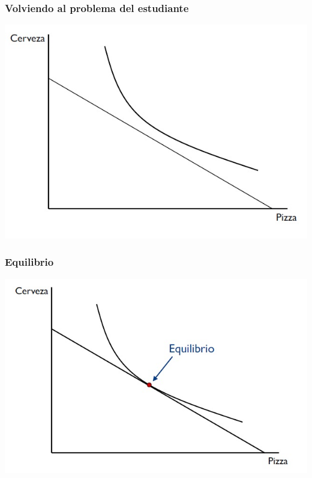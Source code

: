 \documentclass{beamer}
\begin{document}
\begin{frame}
\frametitle{ Volviendo al problema del estudiante}
\centering
\includegraphics[scale=0.65]{Figures/Tema_02.18_rp16.jpg}
\end{frame}

\begin{frame}
\frametitle{ Equilibrio}
\centering
\includegraphics[scale=0.65]{Figures/Tema_02.19_rp17.jpg}
\end{frame}
\end{document}
